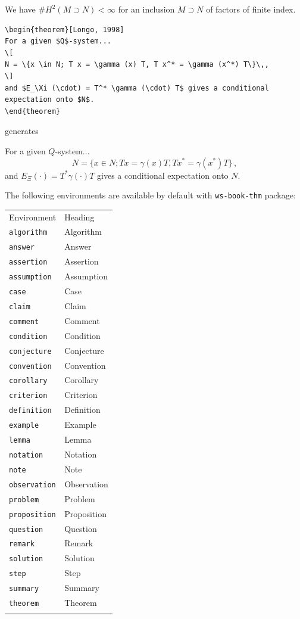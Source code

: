 \begin{theorem}
We have $\# H^2 (M \supset N) < \infty$ for an inclusion $M \supset
N$ of factors of finite index.
\end{theorem}

\begin{verbatim}
\begin{theorem}[Longo, 1998]
For a given $Q$-system...
\[
N = \{x \in N; T x = \gamma (x) T, T x^* = \gamma (x^*) T\}\,,
\]
and $E_\Xi (\cdot) = T^* \gamma (\cdot) T$ gives a conditional
expectation onto $N$.
\end{theorem}
\end{verbatim}

\noindent generates

\begin{theorem}[Longo, 1998]
For a given $Q$-system...
\[
N = \{x \in N; T x = \gamma (x) T, T x^* = \gamma (x^*) T\}\,,
\]
and $E_\Xi (\cdot) = T^* \gamma (\cdot) T$ gives a conditional
expectation onto $N$.
\end{theorem}

The following environments are available by default with \verb|ws-book-thm| package:

\begin{center}
{\tablefont
\begin{tabular}{ll}
\toprule Environment & Heading\\\colrule
\verb|algorithm| & Algorithm\\
\verb|answer| & Answer\\
\verb|assertion| & Assertion\\
\verb|assumption| & Assumption\\
\verb|case| & Case\\
\verb|claim| & Claim\\
\verb|comment| & Comment\\
\verb|condition| & Condition\\
\verb|conjecture| & Conjecture\\
\verb|convention| & Convention\\
\verb|corollary| & Corollary\\
\verb|criterion| & Criterion\\
\verb|definition| & Definition\\
\verb|example| & Example\\
\verb|lemma| & Lemma\\
\verb|notation| & Notation\\
\verb|note| & Note\\
\verb|observation| & Observation\\
\verb|problem| & Problem\\
\verb|proposition| & Proposition\\
\verb|question| & Question\\
\verb|remark| & Remark\\
\verb|solution| & Solution\\
\verb|step| & Step\\
\verb|summary| & Summary\\
\verb|theorem| & Theorem\\\botrule
\end{tabular}}\label{theo}
\end{center}

